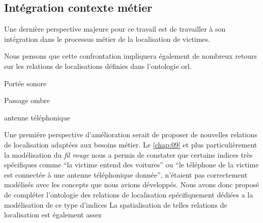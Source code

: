 \subsection*{Intégration contexte métier}

Une dernière perspective majeure pour ce travail est de travailler à
son intégration dans le processus métier de la localisation de victimes.




Nous pensons que cette confrontation impliquera également de nombreux
retours sur les relations de localisations définies dans l'ontologie
\ac{orl}.

Portée sonore

Passage ombre

antenne téléphonique

Une première perspective d'amélioration serait de proposer de
nouvelles relations de localisation adaptées aux besoins métier. Le
\autoref{chap:09} et plus particulièrement la modélisation du
\emph{fil rouge} nous a permis de constater que certains indices très
spécifiques comme \enquote{la victime entend des voitures} ou
\enquote{le téléphone de la victime est connectée à une antenne
  téléphonique donnée}, n'étaient pas correctement modélisés avec les
concepts que nous avions développés.
%
Nous avons donc proposé de compléter l'ontologie des relations de
localisation spécifiquement dédiées a la modélisation de ce type
d'indices
%
La spatialisation de telles relations de localisation est également
assez 


